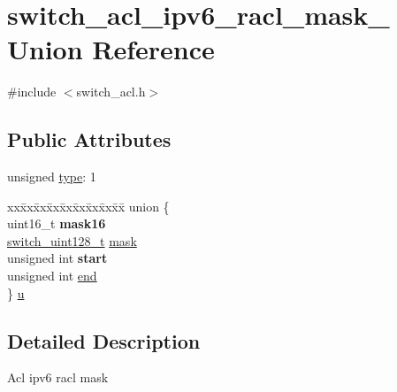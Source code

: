\hypertarget{unionswitch__acl__ipv6__racl__mask__}{\section{switch\+\_\+acl\+\_\+ipv6\+\_\+racl\+\_\+mask\+\_\+ Union Reference}
\label{unionswitch__acl__ipv6__racl__mask__}
}


{\ttfamily \#include $<$switch\+\_\+acl.\+h$>$}

\subsection*{Public Attributes}
\begin{DoxyCompactItemize}
\item 
unsigned \hyperlink{unionswitch__acl__ipv6__racl__mask___a4d230c33ce9614b1b286c24965e80329}{type}\+: 1
\item 
\begin{tabbing}
xx\=xx\=xx\=xx\=xx\=xx\=xx\=xx\=xx\=\kill
union \{\\
\>uint16\_t {\bfseries mask16}\\
\>\hyperlink{structswitch__uint128__t}{switch\_uint128\_t} \hyperlink{unionswitch__acl__ipv6__racl__mask___a44692bb352001ad1175bcf359efa9de7}{mask}\\
\>unsigned int {\bfseries start}\\
\>unsigned int \hyperlink{unionswitch__acl__ipv6__racl__mask___a19ceeb8421ac22033cf31d82b6066679}{end}\\
\} \hyperlink{unionswitch__acl__ipv6__racl__mask___ac8394eed560d3820f29ef4399e501d8a}{u}\\

\end{tabbing}\end{DoxyCompactItemize}


\subsection{Detailed Description}
Acl ipv6 racl mask 

